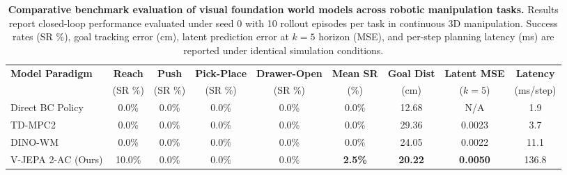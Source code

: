 \begin{table}[t]
\centering
\caption{\textbf{Comparative benchmark evaluation of visual foundation world models across robotic manipulation tasks.} Results report closed-loop performance evaluated under seed 0 with 10 rollout episodes per task in continuous 3D manipulation. Success rates (SR \%), goal tracking error (cm), latent prediction error at $k=5$ horizon (MSE), and per-step planning latency (ms) are reported under identical simulation conditions.}
\label{tab:comparative_results}
\vspace{4pt}
\begin{tabular}{lcccccccc}
\toprule
\textbf{Model Paradigm} & \textbf{Reach} & \textbf{Push} & \textbf{Pick-Place} & \textbf{Drawer-Open} & \textbf{Mean SR} & \textbf{Goal Dist} & \textbf{Latent MSE} & \textbf{Latency} \\
 & (SR \%) & (SR \%) & (SR \%) & (SR \%) & (\%) & (cm) & ($k=5$) & (ms/step) \\
\midrule
Direct BC Policy & 0.0\% & 0.0\% & 0.0\% & 0.0\% & 0.0\% & 12.68 & N/A & 1.9 \\
TD-MPC2 & 0.0\% & 0.0\% & 0.0\% & 0.0\% & 0.0\% & 29.36 & 0.0023 & 3.7 \\
DINO-WM & 0.0\% & 0.0\% & 0.0\% & 0.0\% & 0.0\% & 24.05 & 0.0022 & 11.1 \\
V-JEPA 2-AC (Ours) & 10.0\% & 0.0\% & 0.0\% & 0.0\% & \textbf{2.5\%} & \textbf{20.22} & \textbf{0.0050} & 136.8 \\
\bottomrule
\end{tabular}
\end{table}